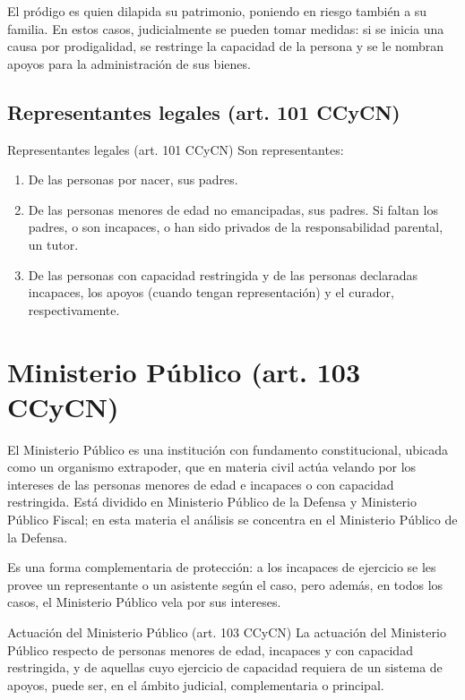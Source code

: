 \documentclass[12pt,oneside]{book}
\begin{document}
El pródigo es quien dilapida su patrimonio, poniendo en riesgo también a su familia. En estos casos, judicialmente se pueden tomar medidas: si se inicia una causa por prodigalidad, se restringe la capacidad de la persona y se le nombran apoyos para la administración de sus bienes.

\subsection{Representantes legales (art. 101 CCyCN)}

\begin{definition}{Representantes legales (art. 101 CCyCN)}
Son representantes:
\begin{enumerate}[label=(\alph*)]
    \item De las personas por nacer, sus padres.
    \item De las personas menores de edad no emancipadas, sus padres. Si faltan los padres, o son incapaces, o han sido privados de la responsabilidad parental, un tutor.
    \item De las personas con capacidad restringida y de las personas declaradas incapaces, los apoyos (cuando tengan representación) y el curador, respectivamente.
\end{enumerate}
\end{definition}

\section{Ministerio Público (art. 103 CCyCN)}

El Ministerio Público es una institución con fundamento constitucional, ubicada como un organismo extrapoder, que en materia civil actúa velando por los intereses de las personas menores de edad e incapaces o con capacidad restringida. Está dividido en Ministerio Público de la Defensa y Ministerio Público Fiscal; en esta materia el análisis se concentra en el Ministerio Público de la Defensa.

\begin{note}
Es una forma complementaria de protección: a los incapaces de ejercicio se les provee un representante o un asistente según el caso, pero además, en todos los casos, el Ministerio Público vela por sus intereses.
\end{note}

\begin{definition}{Actuación del Ministerio Público (art. 103 CCyCN)}
La actuación del Ministerio Público respecto de personas menores de edad, incapaces y con capacidad restringida, y de aquellas cuyo ejercicio de capacidad requiera de un sistema de apoyos, puede ser, en el ámbito judicial, complementaria o principal.
\end{definition}
\end{document}
